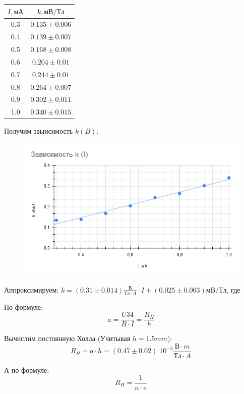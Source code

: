 \documentclass[11pt]{article}
\begin{document}
\begin{table}[H]
    \centering
    \begin{tabular}{|c|c|}
        \hline
        \( I, мА \) & \( k, мВ/Тл \)\\\hline
        0.3 & \( 0.135 \pm 0.006 \) \\\hline
        0.4 & \( 0.139 \pm 0.007 \) \\\hline
        0.5 & \( 0.168 \pm 0.008 \) \\\hline
        0.6 & \( 0.204 \pm 0.01  \) \\\hline
        0.7 & \( 0.244 \pm 0.01  \) \\\hline
        0.8 & \( 0.264 \pm 0.007 \) \\\hline
        0.9 & \( 0.302 \pm 0.011 \) \\\hline
        1.0 & \( 0.340 \pm 0.015 \) \\\hline
    \end{tabular}
\end{table}

Получим заыисимость \( k(B) \):

\begin{figure}[H]
    \centering
    \includegraphics[width=\textwidth]{graf3.png}
\end{figure}

Аппроксимируем: \( k = (0.31 \pm 0.014) \frac{В}{Тл\cdot A}  \cdot I + (0.025 \pm 0.003) мВ/Тл \), где

По формуле:
\[ a = \frac{U34}{B\cdot I} = \frac{R_H}{h} \]

Вычислим постоянную Холла (Учитывая \(h = 1.5 mm\)):
\[ R_H = a\cdot h = (0.47 \pm 0.02) \; 10^{-3}\frac{В\cdot m}{Тл\cdot A} \]

А по формуле:
\[ R_H = \frac{1}{n\cdot e} \]
\end{document}
